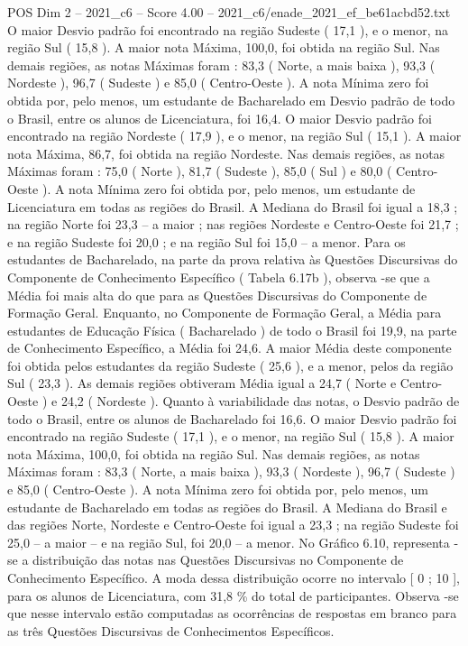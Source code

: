\begin{textsample}{POS Dim 2 – 2021\_c6 – Score 4.00 – 2021\_c6/enade\_2021\_ef\_be61acbd52.txt}
O maior Desvio padrão foi encontrado na região Sudeste ( 17,1 ), e o menor, na região Sul ( 15,8 ).
A maior nota Máxima, 100,0, foi obtida na região Sul.
Nas demais regiões, as notas Máximas foram : 83,3 ( Norte, a mais baixa ), 93,3 ( Nordeste ), 96,7 ( Sudeste ) e 85,0 ( Centro-Oeste ).
A nota Mínima zero foi obtida por, pelo menos, um estudante de Bacharelado em Desvio padrão de todo o Brasil, entre os alunos de Licenciatura, foi 16,4.
O maior Desvio padrão foi encontrado na região Nordeste ( 17,9 ), e o menor, na região Sul ( 15,1 ).
A maior nota Máxima, 86,7, foi obtida na região Nordeste.
Nas demais regiões, as notas Máximas foram : 75,0 ( Norte ), 81,7 ( Sudeste ), 85,0 ( Sul ) e 80,0 ( Centro-Oeste ).
A nota Mínima zero foi obtida por, pelo menos, um estudante de Licenciatura em todas as regiões do Brasil.
A Mediana do Brasil foi igual a 18,3 ; na região Norte foi 23,3 – a maior ; nas regiões Nordeste e Centro-Oeste foi 21,7 ; e na região Sudeste foi 20,0 ; e na região Sul foi 15,0 – a menor.
Para os estudantes de Bacharelado, na parte da prova relativa às Questões Discursivas do Componente de Conhecimento Específico ( Tabela 6.17b ), observa -se que a Média foi mais alta do que para as Questões Discursivas do Componente de Formação Geral.
Enquanto, no Componente de Formação Geral, a Média para estudantes de Educação Física ( Bacharelado ) de todo o Brasil foi 19,9, na parte de Conhecimento Específico, a Média foi 24,6.
A maior Média deste componente foi obtida pelos estudantes da região Sudeste ( 25,6 ), e a menor, pelos da região Sul ( 23,3 ).
As demais regiões obtiveram Média igual a 24,7 ( Norte e Centro-Oeste ) e 24,2 ( Nordeste ).
Quanto à variabilidade das notas, o Desvio padrão de todo o Brasil, entre os alunos de Bacharelado foi 16,6.
O maior Desvio padrão foi encontrado na região Sudeste ( 17,1 ), e o menor, na região Sul ( 15,8 ).
A maior nota Máxima, 100,0, foi obtida na região Sul.
Nas demais regiões, as notas Máximas foram : 83,3 ( Norte, a mais baixa ), 93,3 ( Nordeste ), 96,7 ( Sudeste ) e 85,0 ( Centro-Oeste ).
A nota Mínima zero foi obtida por, pelo menos, um estudante de Bacharelado em todas as regiões do Brasil.
A Mediana do Brasil e das regiões Norte, Nordeste e Centro-Oeste foi igual a 23,3 ; na região Sudeste foi 25,0 – a maior – e na região Sul, foi 20,0 – a menor.
No Gráfico 6.10, representa -se a distribuição das notas nas Questões Discursivas no Componente de Conhecimento Específico.
A moda dessa distribuição ocorre no intervalo [ 0 ; 10 ], para os alunos de Licenciatura, com 31,8 \% do total de participantes.
Observa -se que nesse intervalo estão computadas as ocorrências de respostas em branco para as três Questões Discursivas de Conhecimentos Específicos.

\end{textsample}
